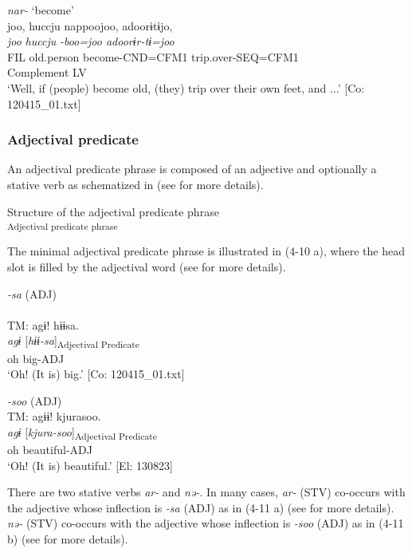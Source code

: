 \ex\textit{nar-} ‘become’\\
\glll joo,  huccju  nappoojoo,  adoorɨtɨjo,\\
    \textit{joo}  \textit{huccju}  \textit{-boo=joo  adoorɨr-tɨ=joo}\\
    FIL  old.person  become-CND=CFM1  trip.over-SEQ=CFM1\\
      Complement  LV  \\
    \glt ‘Well, if (people) become old, (they) trip over their own feet, and ...’     [Co: 120415\_01.txt]
    \z
\z

\subsubsection{Adjectival predicate}\label{sec:4.1.3.2}

An adjectival predicate phrase is composed of an adjective and optionally a stative verb as schematized in  (see  for more details).

\ea  Structure of the adjectival predicate phrase \label{ex:4.9}\\\textsubscript{Adjectival predicate phrase}
\z

The minimal adjectival predicate phrase is illustrated in (4-10 a), where the head slot is filled by the adjectival word (see  for more details).

\ea   \label{ex:4.10}
\ea \textit{{}-sa} (ADJ) \label{ex:4.10a}\\\\
\glll  TM:  agɨ!  hɨɨsa.\\
    \textit{agɨ}  [\textit{hɨɨ-sa}]\textsubscript{Adjectival Predicate}\\
    oh  big-ADJ\\
    \glt     ‘Oh! (It is) big.’ [Co: 120415\_01.txt]

  \ex \textit{{}-soo} (ADJ)\\
\glll  TM:  agɨɨ!  kjurasoo.\\
    \textit{agɨ}  [\textit{kjura-soo}]\textsubscript{Adjectival Predicate}\\
    oh  beautiful-ADJ\\
    \glt     ‘Oh! (It is) beautiful.’ [El: 130823]
    \z
\z

  There are two stative verbs \textit{ar-} and \textit{nə-}. In many cases, \textit{ar-} (STV) co-occurs with the adjective whose inflection is \textit{{}-sa} (ADJ) as in (4-11 a) (see  for more details). \textit{nə-} (STV) co-occurs with the adjective whose inflection is \textit{{}-soo} (ADJ) as in (4-11 b) (see  for more details).

